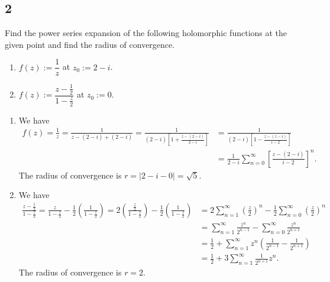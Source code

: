\documentclass[12pt]{article}
\begin{document}
\subsection*{2}
\begin{tcolorbox}
Find the power series expansion of the following holomorphic functions at the given point and find the radius of convergence.

\begin{enumerate}[label=(\alph*),itemsep=5mm,topsep=4mm]
\item $f(z) := \dfrac{1}{z}$ at $z_{0} := 2 - i$.
\item $f(z) := \dfrac{z - \frac{1}{2}}{1 - \frac{z}{2}}$ at $z_{0} := 0$.
\end{enumerate}
\end{tcolorbox}
\begin{enumerate}[label=(\alph*),itemsep=5mm,topsep=4mm]
\item We have 
\begin{align*}
f(z) = \frac{1}{z} = \frac{1}{z - (2-i) + (2-i)} = \frac{1}{(2-i)\left[ 1 + \frac{z - (2-i)}{2-i} \right]} & = \frac{1}{(2-i)\left[ 1 - 
\frac{z - (z-i)}{i - 2} \right]} \\
& = \frac{1}{2-i}\sum_{n=0}^{\infty}\left[ \frac{z - (2-i)}{i-2} \right]^{n}.
\end{align*}
The radius of convergence is $r = |2 - i - 0| = \sqrt{5}$.
\item We have 
\begin{align*}
\frac{z - \frac{1}{2}}{1 - \frac{z}{2}} = \frac{z}{1 - \frac{z}{2}} - \frac{1}{2}\left( \frac{1}{1 - \frac{z}{2}} \right)  = 
2\left( \frac{\frac{z}{2}}{1 - \frac{z}{2}} \right) - \frac{1}{2}\left( \frac{1}{1 - \frac{z}{2}} \right) & = 
2\sum_{n=1}^{\infty}\left( \frac{z}{2} \right)^{n} - \frac{1}{2}\sum_{n=0}^{\infty}\left( \frac{z}{2} \right)^{n} \\
& = \sum_{n=1}^{\infty}\frac{z^{n}}{2^{n-1}} - \sum_{n=0}^{\infty}\frac{z^{n}}{2^{n+1}} \\
& = \frac{1}{2} + \sum_{n=1}^{\infty}z^{n}\left( \frac{1}{2^{n-1}} - \frac{1}{2^{n+1}} \right) \\
& = \frac{1}{2} + 3\sum_{n=1}^{\infty}\frac{1}{2^{n+1}}z^{n}.
\end{align*}
The radius of convergence is $r = 2$.
\end{enumerate}


\newpage 
\end{document}
